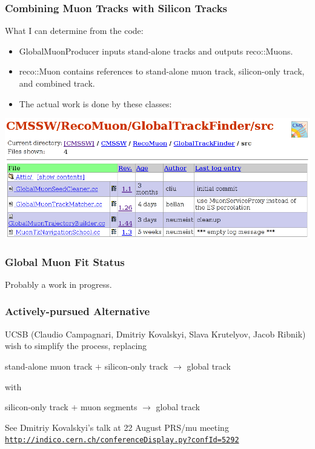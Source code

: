 \documentclass[12pt,compress]{beamer}
\begin{document}
\begin{frame}
\frametitle{Combining Muon Tracks with Silicon Tracks}

What I can determine from the code:
\begin{itemize}
\item GlobalMuonProducer inputs stand-alone tracks and outputs reco::Muons.
\item reco::Muon contains references to stand-alone muon track, silicon-only track, and combined track.
\item The actual work is done by these classes:
\end{itemize}

\begin{center}
\includegraphics[width=0.9\linewidth]{globaltrackfinder.png}
\end{center}
\end{frame}

\begin{frame}
\frametitle{Global Muon Fit Status}
\begin{center}
Probably a work in progress.
\end{center}
\end{frame}

\begin{frame}
\frametitle{Actively-pursued Alternative}

UCSB (Claudio Campagnari, Dmitriy Kovalskyi, Slava Krutelyov, Jacob
Ribnik) wish to simplify the process, replacing

\begin{center}
stand-alone muon track $+$ silicon-only track $\longrightarrow$ global track
\end{center}

with

\begin{center}
silicon-only track $+$ muon segments $\longrightarrow$ global track
\end{center}

\vfill See Dmitriy Kovalskyi's talk at 22 August PRS/mu meeting
{\tt \scriptsize \href{http://indico.cern.ch/conferenceDisplay.py?confId=5292}{http://indico.cern.ch/conferenceDisplay.py?confId=5292}}

\end{frame}
\end{document}
